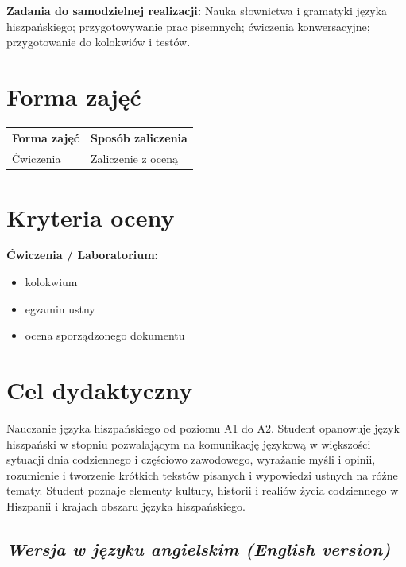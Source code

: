 \documentclass[12pt, a4paper]{article}
\newcommand{\thdrule}{\noalign{\global\setlength{\extrarowheight}{0pt}}}
\newcommand{\thdend}{\noalign{\global\setlength{\extrarowheight}{3pt}}}
\begin{document}
\vspace{4pt}
\noindent\textbf{Zadania do samodzielnej realizacji:} Nauka słownictwa i gramatyki języka hiszpańskiego; przygotowywanie prac pisemnych; ćwiczenia konwersacyjne; przygotowanie do kolokwiów i testów.

\section{Forma zajęć}

\begin{center}
{\scriptsize
\begin{tabular}{m{5cm}m{8cm}}
\thdrule\toprule
\rowcolor{pjatkRed} {\color{white}\textbf{Forma zajęć}} & {\color{white}\textbf{Sposób zaliczenia}} \\
\midrule\thdend
  \rowcolor{tableRowLight} Ćwiczenia & Zaliczenie z oceną \\
\bottomrule
\end{tabular}}
\end{center}

\section{Kryteria oceny}

\textbf{Ćwiczenia / Laboratorium:}
\begin{itemize}
  \item kolokwium
  \item egzamin ustny
  \item ocena sporządzonego dokumentu
\end{itemize}


\section{Cel dydaktyczny}

Nauczanie języka hiszpańskiego od poziomu A1 do A2. Student  opanowuje język hiszpański w stopniu pozwalającym na komunikację językową w większości sytuacji dnia codziennego i częściowo zawodowego, wyrażanie myśli i opinii, rozumienie i tworzenie krótkich tekstów pisanych i wypowiedzi ustnych na różne tematy. Student poznaje elementy kultury, historii i realiów życia codziennego w Hiszpanii i krajach obszaru języka hiszpańskiego.

\subsection*{\textit{Wersja w języku angielskim (English version)}}
\end{document}
